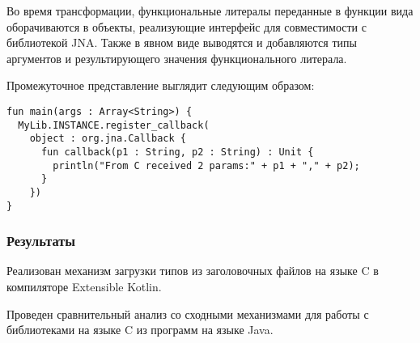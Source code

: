 Во время трансформации, функциональные литералы переданные в функции вида  оборачиваются в объекты, реализующие интерфейс  для совместимости с библиотекой JNA.
Также в явном виде выводятся и добавляются типы аргументов и результирующего значения функционального литерала.

Промежуточное представление выглядит следующим образом:
\begin{code}\begin{lstlisting}[caption={Промежуточное представление программы с трансформацией функции обратного вызова.}, label=transitional-callback-representation]
fun main(args : Array<String>) {
  MyLib.INSTANCE.register_callback(
    object : org.jna.Callback {
      fun callback(p1 : String, p2 : String) : Unit {
        println("From C received 2 params:" + p1 + "," + p2);
      }
    })
}
\end{lstlisting}\end{code}

\subsubsection{Результаты}
Реализован механизм загрузки типов из заголовочных файлов на языке C в компиляторе Extensible Kotlin.

Проведен сравнительный анализ со сходными механизмами для работы с библиотеками на языке C из программ на языке Java.